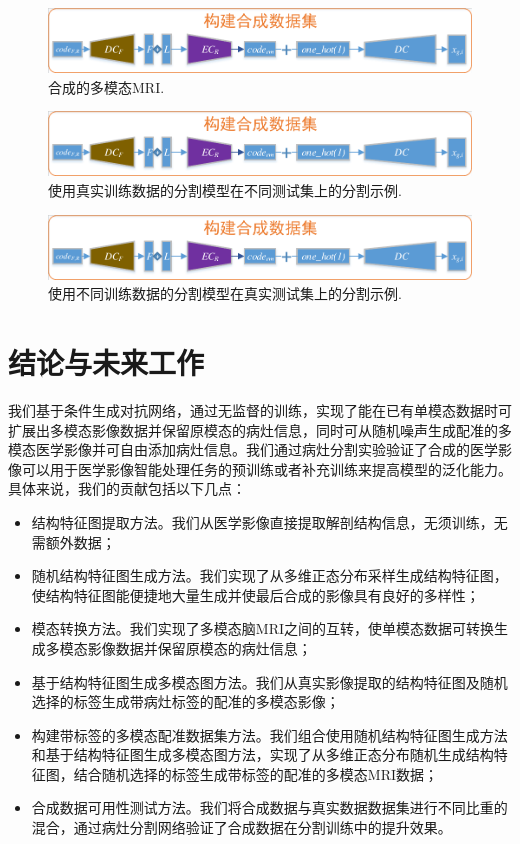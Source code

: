 \documentclass[letterpaper]{article} %
\begin{document}
\begin{figure}
	\centering
	\includegraphics[width=0.98\linewidth]{figures/make_data}
	\caption{合成的多模态MRI.}
	\label{generated_mri}
\end{figure}

\begin{figure}
	\centering
	\includegraphics[width=0.98\linewidth]{figures/make_data}
	\caption{使用真实训练数据的分割模型在不同测试集上的分割示例.}
	\label{label_from_diff_test}
\end{figure}

\begin{figure}
	\centering
	\includegraphics[width=0.98\linewidth]{figures/make_data}
	\caption{使用不同训练数据的分割模型在真实测试集上的分割示例.}
	\label{label_from_diff_train}
\end{figure}

\section{结论与未来工作}
我们基于条件生成对抗网络，通过无监督的训练，实现了能在已有单模态数据时可扩展出多模态影像数据并保留原模态的病灶信息，同时可从随机噪声生成配准的多模态医学影像并可自由添加病灶信息。我们通过病灶分割实验验证了合成的医学影像可以用于医学影像智能处理任务的预训练或者补充训练来提高模型的泛化能力。具体来说，我们的贡献包括以下几点：
\begin{itemize}
	\item 结构特征图提取方法。我们从医学影像直接提取解剖结构信息，无须训练，无需额外数据；
	\item 随机结构特征图生成方法。我们实现了从多维正态分布采样生成结构特征图，使结构特征图能便捷地大量生成并使最后合成的影像具有良好的多样性；
	\item 模态转换方法。我们实现了多模态脑MRI之间的互转，使单模态数据可转换生成多模态影像数据并保留原模态的病灶信息；
	\item 基于结构特征图生成多模态图方法。我们从真实影像提取的结构特征图及随机选择的标签生成带病灶标签的配准的多模态影像；
	\item 构建带标签的多模态配准数据集方法。我们组合使用随机结构特征图生成方法和基于结构特征图生成多模态图方法，实现了从多维正态分布随机生成结构特征图，结合随机选择的标签生成带标签的配准的多模态MRI数据；
	\item 合成数据可用性测试方法。我们将合成数据与真实数据数据集进行不同比重的混合，通过病灶分割网络验证了合成数据在分割训练中的提升效果。
\end{itemize}
\end{document}
